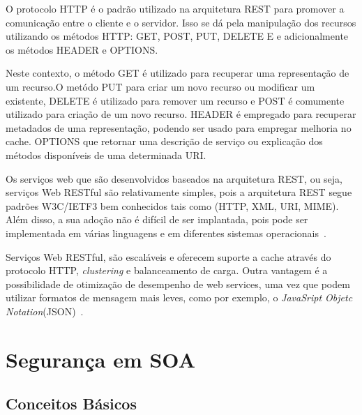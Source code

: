 O protocolo HTTP é o padrão utilizado na arquitetura REST para promover a comunicação entre o cliente e o servidor. Isso se dá pela manipulação dos recursos utilizando os métodos HTTP: GET, POST, PUT, DELETE E e adicionalmente os métodos HEADER e OPTIONS.

Neste contexto, o método GET é utilizado para recuperar uma representação de um recurso.O metódo PUT para criar um novo recurso ou modificar um existente, DELETE é utilizado para remover um recurso e POST é comumente utilizado para criação de um novo recurso. HEADER é empregado para recuperar metadados de uma representação, podendo ser usado para empregar melhoria no cache. OPTIONS que retornar uma descrição de serviço ou explicação dos métodos disponíveis de uma determinada URI.



%

Os serviços web que são desenvolvidos baseados na arquitetura REST, ou seja, serviços Web RESTful  são relativamente simples, pois a arquitetura REST segue padrões W3C/IETF3 bem conhecidos tais como (HTTP, XML, URI, MIME). Além disso, a sua adoção não é difícil de ser implantada, pois pode ser implementada em várias linguagens e em diferentes sistemas operacionais~\cite{Pautasso2008}.

Serviços Web RESTful, são escaláveis e oferecem suporte a cache através do protocolo HTTP, \emph{clustering} e balanceamento de carga. Outra vantagem é a possibilidade de otimização de desempenho de web services, uma vez que podem utilizar formatos de mensagem mais leves, como por exemplo, o \emph{JavaSript Objetc Notation}(JSON)~\cite{Pautasso2008}.


\section{Segurança em SOA}

\subsection{Conceitos Básicos}

